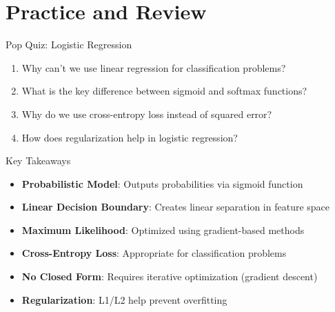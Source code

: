 \documentclass{beamer}
\begin{document}
\section{Practice and Review}

\begin{frame}{Pop Quiz: Logistic Regression}
\begin{enumerate}
\item Why can't we use linear regression for classification problems?
\pause 
\item What is the key difference between sigmoid and softmax functions?
\pause
\item Why do we use cross-entropy loss instead of squared error?
\pause
\item How does regularization help in logistic regression?
\end{enumerate}
\end{frame}

\begin{frame}{Key Takeaways}
\begin{itemize}[<+->]
\item \textbf{Probabilistic Model}: Outputs probabilities via sigmoid function
\item \textbf{Linear Decision Boundary}: Creates linear separation in feature space
\item \textbf{Maximum Likelihood}: Optimized using gradient-based methods
\item \textbf{Cross-Entropy Loss}: Appropriate for classification problems
\item \textbf{No Closed Form}: Requires iterative optimization (gradient descent)
\item \textbf{Regularization}: L1/L2 help prevent overfitting
\end{itemize}
\end{frame}
\end{document}
